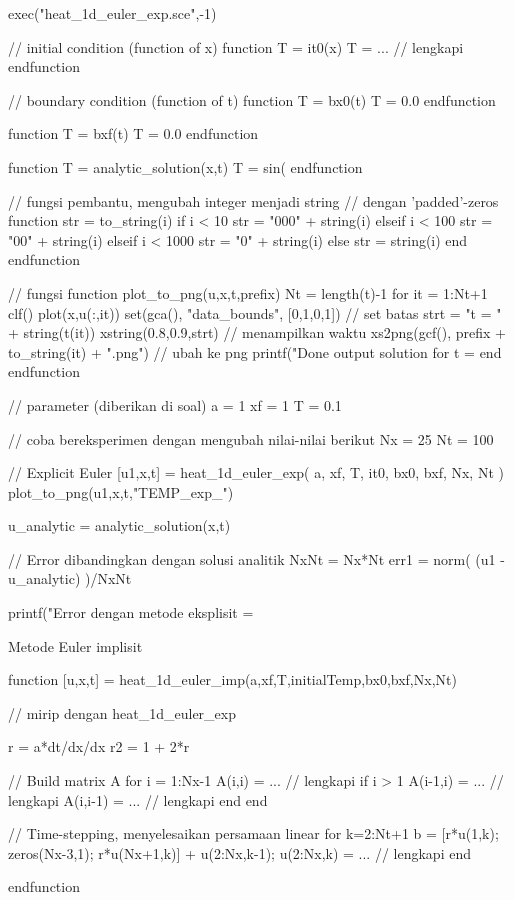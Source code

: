 \documentclass[10pt,bahasa]{article}
\begin{document}
\begin{scilabcode}
exec("heat_1d_euler_exp.sce",-1)

// initial condition (function of x)
function T = it0(x)
  T = ... // lengkapi
endfunction

// boundary condition (function of t)
function T = bx0(t)
  T = 0.0
endfunction

function T = bxf(t)
  T = 0.0
endfunction

function T = analytic_solution(x,t)
  T = sin(%
endfunction

// fungsi pembantu, mengubah integer menjadi string
// dengan 'padded'-zeros
function str = to_string(i)
  if i < 10
    str = "000" + string(i)
  elseif i < 100
    str = "00" + string(i)
  elseif i < 1000
    str = "0" + string(i)
  else
    str = string(i)
  end
endfunction

// fungsi
function plot_to_png(u,x,t,prefix)
  Nt = length(t)-1
  for it = 1:Nt+1
    clf()
    plot(x,u(:,it))
    set(gca(), "data_bounds", [0,1,0,1]) // set batas
    strt = "t = " + string(t(it))
    xstring(0.8,0.9,strt) // menampilkan waktu
    xs2png(gcf(), prefix + to_string(it) + ".png") // ubah ke png
    printf("Done output solution for t = %
  end
endfunction

// parameter (diberikan di soal)
a  = 1
xf = 1
T  = 0.1

// coba bereksperimen dengan mengubah nilai-nilai berikut
Nx = 25
Nt = 100

// Explicit Euler
[u1,x,t] = heat_1d_euler_exp( a, xf, T, it0, bx0, bxf, Nx, Nt )
plot_to_png(u1,x,t,"TEMP_exp_")

u_analytic = analytic_solution(x,t)

// Error dibandingkan dengan solusi analitik
NxNt = Nx*Nt
err1 = norm( (u1 - u_analytic) )/NxNt

printf("Error dengan metode eksplisit = %
\end{scilabcode}

Metode Euler implisit

\begin{scilabcode}
function [u,x,t] = heat_1d_euler_imp(a,xf,T,initialTemp,bx0,bxf,Nx,Nt)

  // mirip dengan heat_1d_euler_exp
  
  r  = a*dt/dx/dx
  r2 = 1 + 2*r
  
  // Build matrix A
  for i = 1:Nx-1
    A(i,i) = ... // lengkapi
    if i > 1
      A(i-1,i) = ... // lengkapi
      A(i,i-1) = ... // lengkapi
    end
  end
  
  // Time-stepping, menyelesaikan persamaan linear
  for k=2:Nt+1
    b = [r*u(1,k); zeros(Nx-3,1); r*u(Nx+1,k)] + u(2:Nx,k-1);
    u(2:Nx,k) = ... // lengkapi
  end
  
endfunction  
\end{scilabcode}
\end{document}
